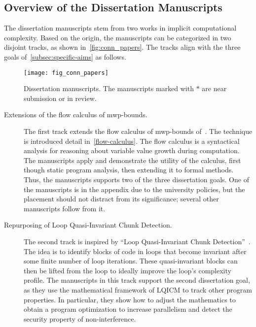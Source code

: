 \subsection{Overview of the Dissertation Manuscripts}
\label{subsec:conn-papers}

The dissertation manuscripts stem from two works in implicit computational complexity.
Based on the origin, the manuscripts can be categorized in two disjoint tracks, as shown in~\autoref{fig:conn_papers}.
The tracks align with the three goals of~\autoref{subsec:specific-aims} as follows.

\begin{figure}[p]
\texttt{[image: fig\_conn\_papers]}
\caption[Dissertation manuscripts]{Dissertation manuscripts. The manuscripts marked with $\ast$ are near submission or in review.}
\label{fig:conn_papers}
\end{figure}

\begin{description}
\item[Extensions of the flow calculus of mwp-bounds.]
The first track extends the flow calculus of mwp-bounds of~\textcite{jones2009}.
The technique is introduced detail in~\autoref{flow-calculus}.
The flow calculus is a syntactical analysis for reasoning about variable value growth during computation.
The manuscripts apply and demonstrate the utility of the calculus, first though static program analysis, then extending it to formal methods.
Thus, the manuscripts supports two of the three dissertation goals.
One of the manuscripts is in the appendix due to the university policies, but the placement should not distract from its significance;
several other manuscripts follow from it.

\item[Repurposing of Loop Quasi-Invariant Chunk Detection.]
The second track is inspired by \enquote{Loop Quasi-Invariant Chunk Detection}~\cite{moyen20172}.
The idea is to identify blocks of code in loops that become invariant after some finite number of loop iterations.
These quasi-invariant blocks can then be lifted from the loop to ideally improve the loop's complexity profile.
The manuscripts in this track support the second dissertation goal,
as they use the mathematical framework of LQICM to track other program properties.
In particular, they show how to adjust the mathematics to obtain a program optimization to increase parallelism and detect the security property of non-interference.
\end{description}

